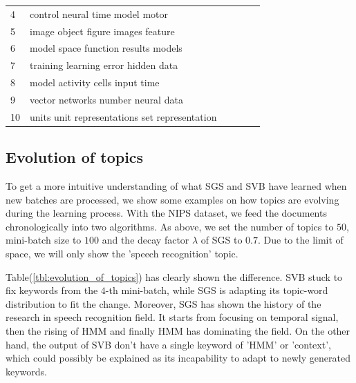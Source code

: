 \documentclass{article} %
\begin{document}
\begin{table}[t]
\begin{center}
\begin{small}
\begin{tabular}{llllll}
4 & control neural time model motor  \\
5 & image object figure images feature \\
6 & model space function results models \\
7 & training learning error hidden data \\
8 & model activity cells input time \\
9 & vector networks number neural data \\ 
10 & units unit representations set representation \\
\hline
\hline
\end{tabular}
\end{small}
\end{center}
\vskip -0.1in
\end{table}

\subsection{Evolution of topics}
To get a more intuitive understanding of what SGS and SVB have learned when new batches are processed, we show some examples on how topics are evolving during the learning process. With the NIPS dataset, we feed the documents chronologically into two algorithms. As above, we set the number of topics to $50$, mini-batch size to $100$ and the decay factor $\lambda$ of SGS to $0.7$. Due to the limit of space, we will only show the 'speech recognition' topic.

Table(\ref{tbl:evolution_of_topics}) has clearly shown the difference. SVB stuck to fix keywords from the $4$-th mini-batch, while SGS is adapting its topic-word distribution to fit the change. Moreover, SGS has shown the history of the research in speech recognition field. It starts from focusing on temporal signal, then the rising of HMM and finally HMM has dominating the field. On the other hand, the output of SVB don't have a single keyword of 'HMM' or 'context', which could possibly be explained as its incapability to adapt to newly generated keywords.
\end{document}
